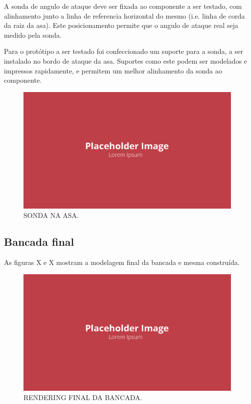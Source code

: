 A sonda de angulo de ataque deve ser fixada ao componente a ser testado, com alinhamento junto a linha de referencia horizontal do mesmo (i.e. linha de corda da raiz da asa). Este posicionamento permite que o angulo de ataque real seja medido pela sonda. 

Para o protótipo a ser testado foi confeccionado um suporte para a sonda, a ser instalado no bordo de ataque da asa. Suportes como este podem ser modelados e impressos rapidamente, e permitem um melhor alinhamento da sonda ao componente.

\begin{figure}[!ht]
    \centering
    \includegraphics[width=.8\linewidth]{figuras/placeholder.png}
    \caption{SONDA NA ASA\cite{autor}.}
    \label{fig:placeholder}
\end{figure}

\subsection{Bancada final}

As figuras X e X mostram a modelagem final da bancada e mesma construída.

\begin{figure}[!ht]
    \centering
    \includegraphics[width=.8\linewidth]{figuras/placeholder.png}
    \caption{RENDERING FINAL DA BANCADA\cite{autor}.}
    \label{fig:placeholder}
\end{figure}

